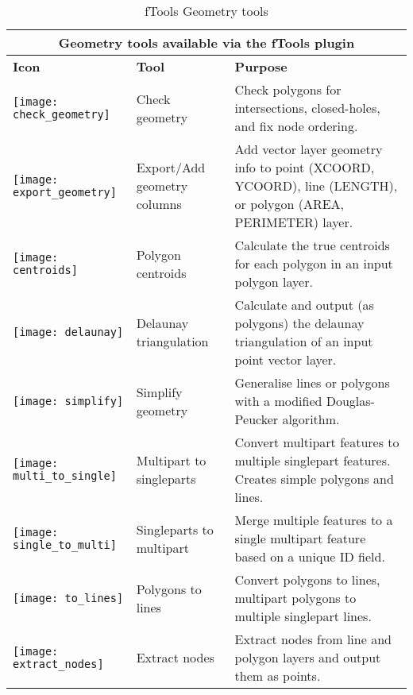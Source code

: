 \begin{table}[ht]
\centering
\caption{fTools Geometry tools}\label{tab:ftool_geometry}\medskip
 \begin{tabular}{|p{0.3in}|p{1.2in}|p{4.8in}|}
 \hline \multicolumn{3}{|c|}{\textbf{Geometry tools available via the fTools plugin}} \\
 \hline \textbf{Icon} & \textbf{Tool} & \textbf{Purpose} \\
 \hline \texttt{[image: check\_geometry]} & Check geometry & 
Check polygons for intersections, closed-holes, and fix node ordering. \\
 \hline \texttt{[image: export\_geometry]} & Export/Add geometry 
columns & Add vector layer geometry info to point (XCOORD, YCOORD), 
line (LENGTH), or polygon (AREA, PERIMETER) layer. \\
 \hline \texttt{[image: centroids]} & Polygon centroids & 
Calculate the true centroids for each polygon in an input polygon layer. \\
 \hline \texttt{[image: delaunay]} & Delaunay triangulation & 
Calculate and output (as polygons) the delaunay triangulation of an input point vector layer. \\
 \hline \texttt{[image: simplify]} & Simplify geometry & 
Generalise lines or polygons with a modified Douglas-Peucker algorithm. \\
 \hline \texttt{[image: multi\_to\_single]} & Multipart to 
singleparts & Convert multipart features to multiple singlepart features. 
Creates simple polygons and lines. \\
 \hline \texttt{[image: single\_to\_multi]} & Singleparts to 
multipart & Merge multiple features to a single multipart feature based 
on a unique ID field. \\
 \hline \texttt{[image: to\_lines]} & Polygons to lines 
& Convert polygons to lines, multipart polygons to multiple singlepart lines. \\
 \hline \texttt{[image: extract\_nodes]} & Extract nodes & 
Extract nodes from line and polygon layers and output them as points. \\
 \hline
\end{tabular}
\end{table}

